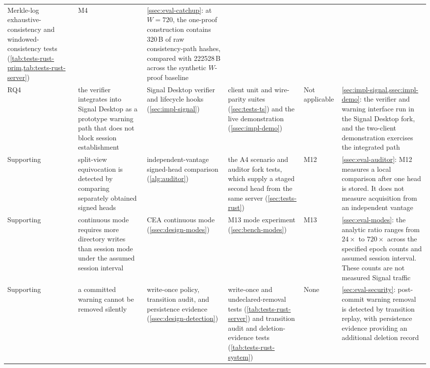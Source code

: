 \begin{landscape}
\begin{table}[htbp]
\begin{tabular}{@{}L{1.6cm}L{4.3cm}L{3.7cm}L{5.4cm}L{1.7cm}L{5.4cm}@{}}
Merkle-log exhaustive-consistency and windowed-consistency tests
(\cref{tab:tests-rust-prim,tab:tests-rust-server}) &
M4 & \cref{ssec:eval-catchup}: at $W=720$, the one-proof construction contains \num{320}\,B of
raw consistency-path hashes, compared with \num{222528}\,B across the synthetic $W$-proof
baseline \\
RQ4 & the verifier integrates into Signal Desktop as a prototype warning path that does not block
session establishment &
Signal Desktop verifier and lifecycle hooks (\cref{sec:impl-signal}) &
client unit and wire-parity suites (\cref{sec:tests-ts}) and the live demonstration
(\cref{ssec:impl-demo}) &
Not applicable & \cref{sec:impl-signal,ssec:impl-demo}: the verifier and warning interface run in
the Signal Desktop fork, and the two-client demonstration exercises the integrated path \\
\midrule
Supporting & split-view equivocation is detected by comparing separately obtained signed heads &
independent-vantage signed-head comparison (\cref{alg:auditor}) &
the A4 scenario and auditor fork tests, which supply a staged second head from the same server (\cref{sec:tests-rust}) &
M12 & \cref{ssec:eval-auditor}: M12 measures a local comparison after one head is stored. It does
not measure acquisition from an independent vantage \\
Supporting & continuous mode requires more directory writes than session mode under the assumed
session interval &
CEA continuous mode (\cref{ssec:design-modes}) &
M13 mode experiment (\cref{sec:bench-modes}) &
M13 & \cref{ssec:eval-modes}: the analytic ratio ranges from $24\times$ to $720\times$ across the
specified epoch counts and assumed session interval. These counts are not measured Signal
traffic \\
Supporting & a committed warning cannot be removed silently &
write-once policy, transition audit, and persistence evidence
(\cref{ssec:design-detection}) &
write-once and undeclared-removal tests (\cref{tab:tests-rust-server}) and transition audit and
deletion-evidence tests (\cref{tab:tests-rust-system}) &
None & \cref{sec:eval-security}: post-commit warning removal is detected by transition replay,
with persistence evidence providing an additional deletion record \\
\bottomrule
\end{tabular}
\end{table}
\end{landscape}

